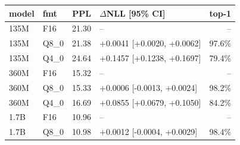 \begin{tabular}{llrlr}\toprule
model & fmt & PPL & $\Delta$NLL [95\% CI] & top-1\\\midrule
135M & F16 & 21.30 & -- & --\\
135M & Q8\_0 & 21.38 & +0.0041 [+0.0020, +0.0062] & 97.6\%\\
135M & Q4\_0 & 24.64 & +0.1457 [+0.1238, +0.1697] & 79.4\%\\
360M & F16 & 15.32 & -- & --\\
360M & Q8\_0 & 15.33 & +0.0006 [-0.0013, +0.0024] & 98.2\%\\
360M & Q4\_0 & 16.69 & +0.0855 [+0.0679, +0.1050] & 84.2\%\\
1.7B & F16 & 10.96 & -- & --\\
1.7B & Q8\_0 & 10.98 & +0.0012 [-0.0004, +0.0029] & 98.4\%\\
\bottomrule\end{tabular}